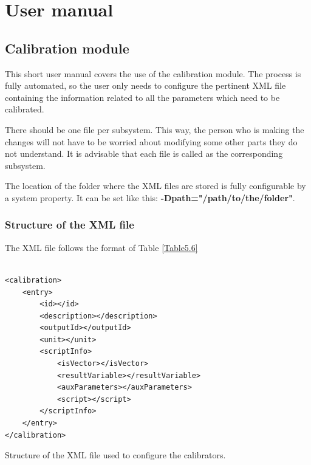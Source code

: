 \section{User manual}
\subsection{Calibration module}
This short user manual covers the use of the calibration module. The process is fully automated, so the user only needs to configure the pertinent XML file containing the information related to all the parameters which need to be calibrated.

There should be one file per subsystem. This way, the person who is making the changes will not have to be worried about modifying some other parts they do not understand. It is advisable that each file is called as the corresponding subsystem.


The location of the folder where the XML files are stored is fully configurable by a system property. It can be set like this: \textbf{-Dpath="/path/to/the/folder"}.
\pagebreak
\subsubsection{Structure of the XML file}

The XML file follows the format of Table \ref{Table5.6}
\begin{table}[H]
\lstset{language=XML}
\begin{lstlisting}

<calibration>
	<entry>
		<id></id>
		<description></description>
		<outputId></outputId>
		<unit></unit>
		<scriptInfo>
			<isVector></isVector>
			<resultVariable></resultVariable>
			<auxParameters></auxParameters>
			<script></script>
		</scriptInfo>
	</entry>
</calibration>
\end{lstlisting}
\caption{Structure of the XML file used to configure the calibrators.}
\label{Table5.6}
\end{table}


